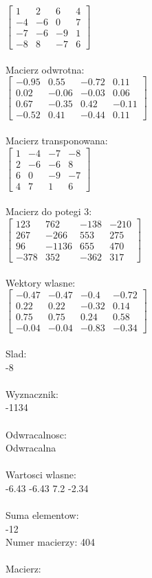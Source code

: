 \documentclass[a4paper,12pt]{article}
\begin{document}
$\begin{bmatrix} 1&2&6&4\\-4&-6&0&7\\-7&-6&-9&1\\-8&8&-7&6 \end{bmatrix}$
\\
\\
Macierz odwrotna:\\

$\begin{bmatrix} -0.95&0.55&-0.72&0.11\\0.02&-0.06&-0.03&0.06\\0.67&-0.35&0.42&-0.11\\-0.52&0.41&-0.44&0.11 \end{bmatrix}$
\\
\\
Macierz transponowana:\\

$\begin{bmatrix} 1&-4&-7&-8\\2&-6&-6&8\\6&0&-9&-7\\4&7&1&6 \end{bmatrix}$
\\
\\
Macierz do potegi 3:\\

$\begin{bmatrix} 123&762&-138&-210\\267&-266&553&275\\96&-1136&655&470\\-378&352&-362&317 \end{bmatrix}$
\\
\\
Wektory wlasne:\\

$\begin{bmatrix} -0.47&-0.47&-0.4&-0.72\\0.22&0.22&-0.32&0.14\\0.75&0.75&0.24&0.58\\-0.04&-0.04&-0.83&-0.34 \end{bmatrix}$
\\
\\
Slad:\\
-8
\\
\\
Wyznacznik:\\
-1134
\\
\\
Odwracalnosc:\\
Odwracalna
\\
\\
Wartosci wlasne:\\
-6.43 -6.43 7.2 -2.34
\\
\\
Suma elementow:\\
-12
\\
\newpage
Numer macierzy:
404
\\
\\
Macierz:\\
\end{document}

